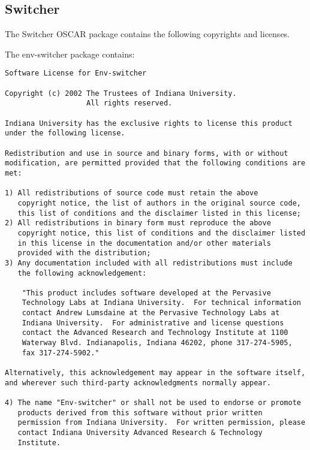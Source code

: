 %
%
%

\subsection{Switcher}
The Switcher OSCAR package contains the following copyrights and licenses.

The env-switcher package contains:

\begin{verbatim}
Software License for Env-switcher

Copyright (c) 2002 The Trustees of Indiana University.  
                   All rights reserved.

Indiana University has the exclusive rights to license this product
under the following license.

Redistribution and use in source and binary forms, with or without
modification, are permitted provided that the following conditions are
met:

1) All redistributions of source code must retain the above
   copyright notice, the list of authors in the original source code,
   this list of conditions and the disclaimer listed in this license; 
2) All redistributions in binary form must reproduce the above
   copyright notice, this list of conditions and the disclaimer listed
   in this license in the documentation and/or other materials
   provided with the distribution; 
3) Any documentation included with all redistributions must include
   the following acknowledgement:

    "This product includes software developed at the Pervasive
    Technology Labs at Indiana University.  For technical information
    contact Andrew Lumsdaine at the Pervasive Technology Labs at
    Indiana University.  For administrative and license questions
    contact the Advanced Research and Technology Institute at 1100
    Waterway Blvd. Indianapolis, Indiana 46202, phone 317-274-5905,
    fax 317-274-5902."

Alternatively, this acknowledgement may appear in the software itself,
and wherever such third-party acknowledgments normally appear.

4) The name "Env-switcher" or shall not be used to endorse or promote
   products derived from this software without prior written
   permission from Indiana University.  For written permission, please
   contact Indiana University Advanced Research & Technology
   Institute.


\end{verbatim}
